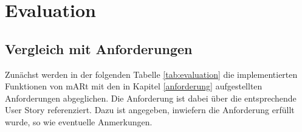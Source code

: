 

\chapter{Evaluation}
\label{evaluation}

\section{Vergleich mit Anforderungen}

Zunächst werden in der folgenden Tabelle \ref{tab:evaluation} die implementierten Funktionen von mARt mit den in Kapitel \ref{anforderung} aufgestellten Anforderungen abgeglichen. Die Anforderung ist dabei über die entsprechende User Story referenziert. Dazu ist angegeben, inwiefern die Anforderung erfüllt wurde, so wie eventuelle Anmerkungen. 

